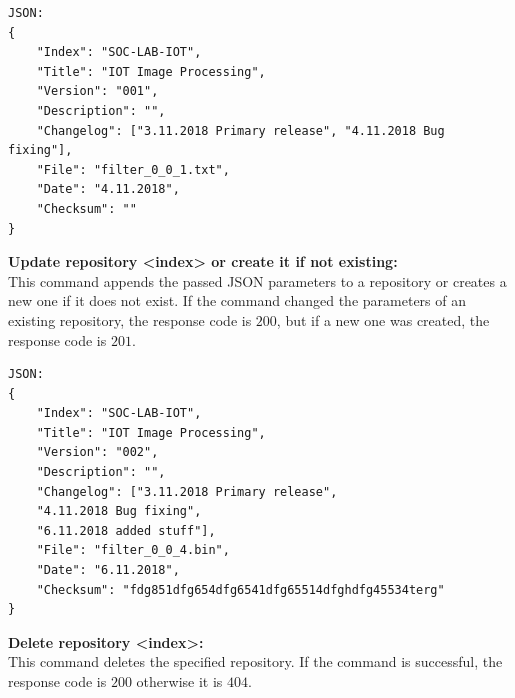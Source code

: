 \begin{verbatim}
JSON:
{
    "Index": "SOC-LAB-IOT",
    "Title": "IOT Image Processing",
    "Version": "001",
    "Description": "",
    "Changelog": ["3.11.2018 Primary release", "4.11.2018 Bug fixing"],
    "File": "filter_0_0_1.txt",
    "Date": "4.11.2018",
    "Checksum": ""
}	    
\end{verbatim}

\textbf{Update repository <index> or create it if not existing:}\\
This command appends the passed JSON parameters to a repository or creates a new one if it does not exist. If the command changed the parameters of an existing repository, the response code is $200$, but if a new one was created, the response code is $201$.

\begin{table}[htbp]
    \centering
\end{table}

\begin{verbatim}
JSON:
{
    "Index": "SOC-LAB-IOT",
    "Title": "IOT Image Processing",
    "Version": "002",
    "Description": "",
    "Changelog": ["3.11.2018 Primary release", 
    "4.11.2018 Bug fixing", 
    "6.11.2018 added stuff"],
    "File": "filter_0_0_4.bin",
    "Date": "6.11.2018",
    "Checksum": "fdg851dfg654dfg6541dfg65514dfghdfg45534terg"
}	
\end{verbatim}

\textbf{Delete repository <index>:}\\
This command deletes the specified repository. If the command is successful, the response code is $200$ otherwise it is $404$.

\begin{table}[htbp]
    \centering
\end{table}

